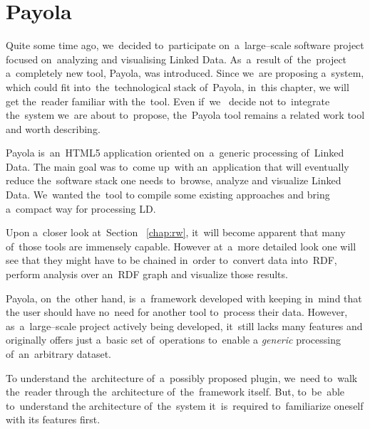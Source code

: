 \chapter{Payola}
\label{ch:payola}

Quite some time ago, we~decided to~participate on~a~large--scale software 
project focused on~analyzing and visualising Linked Data. As~a~result of~the~project
a~completely new tool, Payola, was introduced. Since we~are proposing a~system, which could fit into~the~technological stack of~Payola, in~this chapter, 
we will get the~reader familiar with the~tool. Even if~we~ decide 
not to~integrate the~system we~are about to~propose, the~Payola tool remains
a related work tool and worth describing.

Payola is~an~HTML5 application oriented on~a~generic processing of~Linked Data. 
The main goal was to~come up~with an~application that will eventually reduce the~software 
stack one needs to~browse, analyze and visualize Linked Data. We~wanted the~tool 
to compile some existing approaches and bring a~compact way for processing LD.

Upon a~closer look at~Section ~\ref{chap:rw}, it~will become apparent that many of~those tools are
immensely capable. However at~a~more detailed look one will see that they might have to
be chained in~order to~convert data into~RDF, perform analysis over an~RDF graph and visualize those results.

Payola, on~the~other hand, is~a~framework developed with keeping in~mind that 
the user should have no~need for another tool to~process their data. However, as~a~large--scale project actively being developed, it~still lacks many 
features and originally offers just a~basic set of~operations to~enable a
\emph{generic} processing of~an~arbitrary dataset.

To understand the~architecture of~a~possibly proposed plugin, we~need to~walk the~reader 
through the~architecture of~the~framework itself. But, to~be~able to~understand 
the architecture of~the~system it~is~required to~familiarize oneself with its features first.

